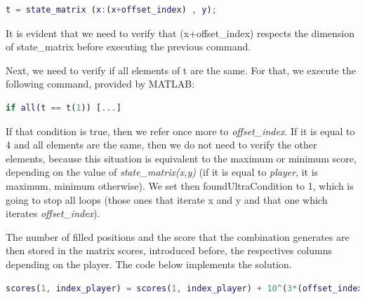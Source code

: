 \vspace{10pt}

\begin{lstlisting}[language=Matlab]
t = state_matrix (x:(x+offset_index) , y);
\end{lstlisting}

\vspace{10pt}

It is evident that we need to verify that (x+offset\_index) respects the
dimension of state\_matrix before executing the previous command.

\vspace{10pt}

Next, we need to verify if all elements of t are the same. For that, we execute
the following command, provided by MATLAB:

\vspace{10pt}

\begin{lstlisting}[language=Matlab]
if all(t == t(1)) [...]
\end{lstlisting}

\vspace{10pt}

If that condition is true, then we refer once more to \textit{offset\_index}. If
it is equal to 4 and all elements are the same, then we do not need to verify the
other elements, because this situation is equivalent to the maximum or minimum
score, depending on the value of \textit{state\_matrix(x,y)} (if it is equal to
\textit{player}, it is maximum, minimum otherwise). We set then
foundUltraCondition to 1, which is going to stop all loops (those ones that iterate x and y and that one which
iterates \textit{offset\_index}).

\vspace{10pt}

The number of filled positions and the score that the combination generates are
then stored in the matrix scores, introduced before, the respectives columns
depending on the player. The code below implements the solution.

\vspace{10pt}

\begin{lstlisting}[language=Matlab]
scores(1, index_player) = scores(1, index_player) + 10^(3*(offset_index+1));
\end{lstlisting}

\vspace{10pt}

